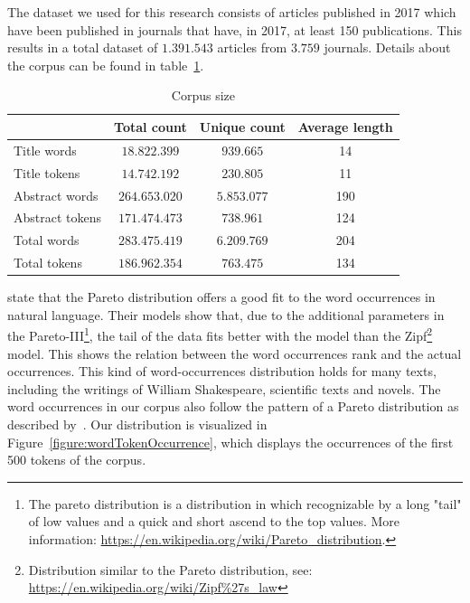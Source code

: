 \documentclass[../../Thesis.tex]{subfiles}
\begin{document}
The dataset we used for this research consists of articles published in 2017 which have been published in journals that have, in 2017, at least 150 publications. This results in a total dataset of $1.391.543$ articles from $3.759$ journals. Details about the corpus can be found in table~\ref{table:corpusSize}.
\begin{table}[hbt]
\begin{center}
\begin{tabular}{|l|c|c|c|}
\hline
 & Total count & Unique count & Average length\footnotemark \\
\hline\hline
Title words & $18.822.399$ & $939.665$ & 14  \\
\hline
Title tokens & $14.742.192$ & $230.805$ & 11 \\
\hline\hline
Abstract words & $264.653.020$ & $5.853.077$  & 190  \\
\hline
Abstract tokens & $171.474.473$ & $738.961$ & 124 \\
\hline\hline
Total words & $283.475.419$ & $6.209.769$  & 204 \\
\hline
Total tokens & $186.962.354$ & $763.475$ & 134 \\
\hline
\end{tabular}
\end{center}
\caption{Corpus size}\label{table:corpusSize}
\end{table}
\clearpage
{}
\citet{wiegand2018word} state that the Pareto distribution offers a good fit to the word occurrences in natural language. Their models show that, due to the additional parameters in the Pareto-III\footnote{The pareto distribution is a distribution in which recognizable by a long "tail" of low values and a quick and short ascend to the top values. More information: \url{https://en.wikipedia.org/wiki/Pareto_distribution}.}, the tail of the data fits better with the model than the Zipf\footnote{Distribution similar to the Pareto distribution, see: \url{https://en.wikipedia.org/wiki/Zipf\%27s_law}} model. This shows the relation between the word occurrences rank and the actual occurrences. This kind of word-occurrences distribution holds for many texts, including the writings of William Shakespeare, scientific texts and novels\cite{thurner2015understanding}.
The word occurrences in our corpus also follow the pattern of a Pareto distribution as described by~\citet{wiegand2018word}. Our distribution is visualized in Figure~\ref{figure:wordTokenOccurrence}, which displays the occurrences of the first 500 tokens of the corpus.
\end{document}

